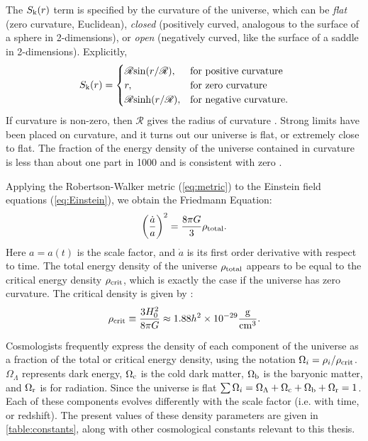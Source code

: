 The $S_{\rm k}(r)$ term is specified by the curvature of the universe, which can be {\it flat} (zero curvature, Euclidean), {\it closed} (positively curved, analogous to the surface of a sphere in 2-dimensions), or {\it open} (negatively curved, like the surface of a saddle in 2-dimensions). Explicitly,
\begin{equation}
S_{\rm k}(r) = 
    \begin{cases}
        \mathscr{R}{\rm sin}(r/\mathscr{R}), & \text{for positive curvature} \\
        r,              & \text{for zero curvature} \\
        \mathscr{R}{\rm sinh}(r/\mathscr{R}), & \text{for negative curvature.}
    \end{cases}
\end{equation}
If curvature is non-zero, then $\mathscr R$ gives the radius of curvature \citep{RydenText}. Strong limits have been placed on curvature, and it turns out our universe is flat, or extremely close to flat. The fraction of the energy density of the universe contained in curvature is less than about one part in 1000 and is consistent with zero \citep{PlanckXVI}.

Applying the Robertson-Walker metric (\autoref{eq:metric}) to the Einstein field equations (\autoref{eq:Einstein}), we obtain the Friedmann Equation:
\begin{equation}
\left( \frac{\dot a}{a} \right)^2 = \frac{8\pi G}{3} \rho_{\rm total}.
\end{equation}
Here $a=a(t)$ is the scale factor, and $\dot a$ is its first order derivative with respect to time. The total energy density of the universe $\rho_{\rm total}$ appears to be equal to the critical energy density $\rho_{\rm crit}$, which is exactly the case if the universe has zero curvature. The critical density is given by \citep{DodelsonText}:
\begin{equation}
\rho_{\rm crit} \equiv \frac{3H_0^2}{8\pi G} \approx 1.88h^2 \times 10^{-29} \frac{\rm g}{{\rm cm}^3}.
\end{equation}

Cosmologists frequently express the density of each component of the universe as a fraction of the total or critical energy density, using the notation $\Omega_i = \rho_i / \rho_{\rm crit}$. $\Omega_{\Lambda}$ represents dark energy, $\Omega_{\rm c}$ is the cold dark matter, $\Omega_{\rm b}$ is the baryonic matter, and $\Omega_{\rm r}$ is for radiation. Since the universe is flat $\sum \Omega_i = \Omega_{\Lambda} + \Omega_{\rm c} + \Omega_{\rm b} + \Omega_{\rm r} =1$. Each of these components evolves differently with the scale factor (i.e. with time, or redshift). The present values of these density parameters are given in \autoref{table:constants}, along with other cosmological constants relevant to this thesis.


